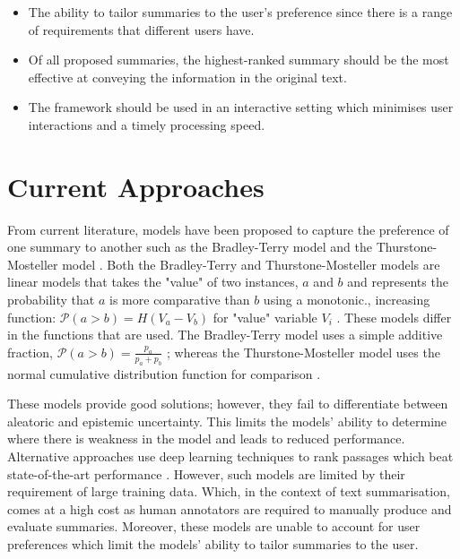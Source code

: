 \documentclass[ %
                    author={James Stephenson},
                supervisor={Dr. Edwin Simpson},
                    degree={MSc},
                     title={PROJECT PLAN},
                  subtitle={ Bayesian Deep Learning For Extractive Test Summarisation},
                      type={},
                      year={2022}]{../additions/dissertation}
\begin{document}
		\begin{itemize}
			\item {The ability to tailor summaries to the user’s preference since there is a range of requirements that different users have.}
			\item{Of all proposed summaries, the highest-ranked summary should be the most effective at conveying the information in the original text.}
			\item {The framework should be used in an interactive setting which minimises user interactions and a timely processing speed.}
		\end{itemize}
		
		\section{Current Approaches}
		\label{chap:introduction:curr_approaches}
		
			From current literature, models have been proposed to capture the preference of one summary to another such as the Bradley-Terry model \cite{Bradley52} and the Thurstone-Mosteller model \cite{Thurstone27, Mosteller51}. Both the Bradley-Terry and Thurstone-Mosteller models are linear models that takes the "value" of two instances, $a$ and $b$ and represents the probability that $a$ is more comparative than $b$ using a monotonic., increasing function: $\mathcal{P}(a > b) = H(V_a - V_b) $ for "value" variable $V_i$ \cite{Handley01}. These models differ in the functions that are used. The Bradley-Terry model uses a simple additive fraction, $\mathcal{P}(a > b) = \frac{p_a}{p_a + p_b}$ \cite{Hunter04}; whereas the Thurstone-Mosteller model uses  the normal cumulative distribution function for comparison \cite{Handley01}.
		
		\medbreak
		These models provide good solutions; however, they fail to differentiate between aleatoric and epistemic uncertainty. This limits the models’ ability to determine where there is weakness in the model and leads to reduced performance. Alternative approaches use deep learning techniques to rank passages which beat state-of-the-art performance \cite{Xu19}. However, such models are limited by their requirement of large training data. Which, in the context of text summarisation, comes at a high cost as human annotators are required to manually produce and evaluate summaries. Moreover, these models are unable to account for user preferences which limit the models' ability to tailor summaries to the user.
		
\end{document}
